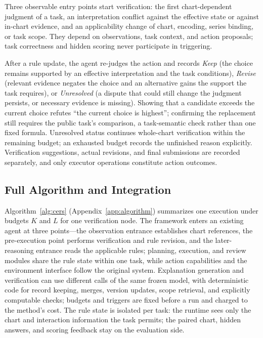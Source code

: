 Three observable entry points start verification: the
first chart-dependent judgment of a task, an
interpretation conflict against the effective state or
against in-chart evidence, and an applicability change
of chart, encoding, series binding, or task scope.
They depend on observations, task context, and action
proposals; task correctness and hidden scoring never
participate in triggering.

After a rule update, the agent re-judges the action and
records \emph{Keep} (the choice remains supported by an
effective interpretation and the task conditions),
\emph{Revise} (relevant evidence negates the choice and
an alternative gains the support the task requires), or
\emph{Unresolved} (a dispute that could still change
the judgment persists, or necessary evidence is
missing).
Showing that a candidate exceeds the current choice
refutes ``the current choice is highest''; confirming
the replacement still requires the public task's
comparison, a task-semantic check rather than one fixed
formula.
Unresolved status continues whole-chart verification
within the remaining budget; an exhausted budget
records the unfinished reason explicitly.
Verification suggestions, actual revisions, and final
submissions are recorded separately, and only executor
operations constitute action outcomes.

\subsection{Full Algorithm and Integration}
\label{sec:method:algorithm}

Algorithm~\ref{alg:cers}
(Appendix~\ref{app:algorithm}) summarizes one \ours{}
execution under budgets $K$ and $L$ for one
verification node.
The framework enters an existing agent at three
points---the observation entrance establishes chart
references, the pre-execution point performs
verification and rule revision, and the later-reasoning
entrance reads the applicable rules; planning,
execution, and review modules share the rule state
within one task, while action capabilities and the
environment interface follow the original system.
Explanation generation and verification can use
different calls of the same frozen model, with
deterministic code for record keeping, merges, version
updates, scope retrieval, and explicitly computable
checks; budgets and triggers are fixed before a run and
charged to the method's cost.
The rule state is isolated per task: the runtime sees
only the chart and interaction information the task
permits; the paired chart, hidden answers, and scoring
feedback stay on the evaluation side.


